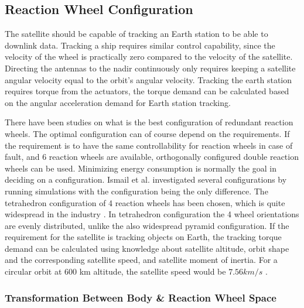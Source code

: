 
\subsection{Reaction Wheel Configuration}

The satellite should be capable of tracking an Earth station to be able to downlink data. Tracking a ship requires similar control capability, since the velocity of the wheel is practically zero compared to the velocity of the satellite. Directing the antennas to the nadir continuously only requires keeping a satellite angular velocity equal to the orbit's angular velocity.
Tracking the earth station requires torque from the actuators, the torque demand can be calculated based on the angular acceleration demand for Earth station tracking.




There have been studies on what is the best configuration of redundant reaction wheels. The optimal configuration can of course depend on the requirements. If the requirement is to have the same controllability for reaction wheels in case of fault, and 6 reaction wheels are available, orthogonally configured double reaction wheels can be used. Minimizing energy consumption is normally the goal in deciding on a configuration. Ismail et al. \cite{ReactionWheelConfigSim} investigated several configurations by running simulations with the configuration being the only difference. The tetrahedron configuration of 4 reaction wheels has been chosen, which is quite widespread in the industry \cite{reactConfigNasa}.
In tetrahedron configuration the 4 wheel orientations are evenly distributed, unlike the also widespread pyramid configuration. 
If the requirement for the satellite is tracking objects on Earth, the tracking torque demand can be calculated using knowledge about satellite altitude, orbit shape and the corresponding satellite speed, and satellite moment of inertia. For a circular orbit at 600 km altitude, the satellite speed would be $7.56 km/s$ \cite{satSpeed}.


\subsubsection{Transformation Between Body \& Reaction Wheel Space}

